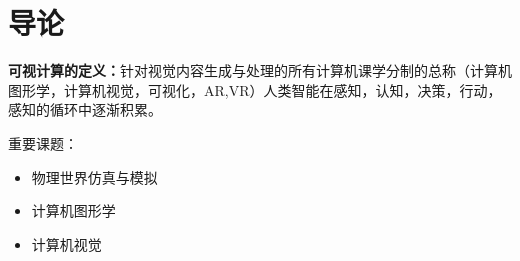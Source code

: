 \section{导论}

\textbf{可视计算的定义：}针对视觉内容生成与处理的所有计算机课学分制的总称（计算机图形学，计算机视觉，可视化，AR,VR）人类智能在感知，认知，决策，行动，感知的循环中逐渐积累。

重要课题：
\begin{itemize}
    \item 物理世界仿真与模拟
    \item 计算机图形学
    \item 计算机视觉
\end{itemize}

